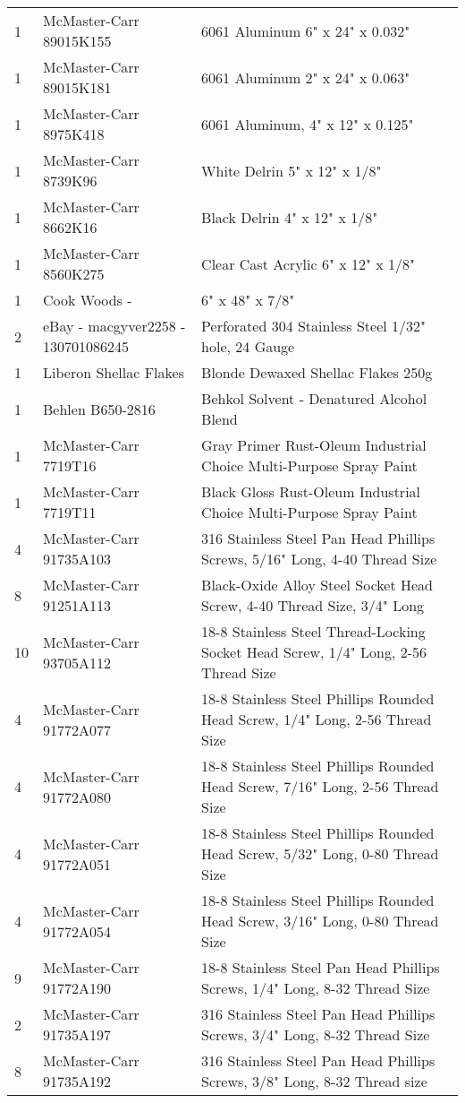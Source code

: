 \begin{longtabu}{X[1,c,m] X[6,c,m] X[9,l,m]}
  1 & McMaster-Carr 89015K155 & 6061 Aluminum 6" x 24" x 0.032" \\
  1 & McMaster-Carr 89015K181 & 6061 Aluminum 2" x 24" x 0.063" \\
  1 & McMaster-Carr 8975K418 & 6061 Aluminum, 4" x 12" x 0.125" \\
  1 & McMaster-Carr 8739K96 & White Delrin 5" x 12" x 1/8" \\
  1 & McMaster-Carr 8662K16 & Black Delrin 4" x 12" x 1/8" \\
  1 & McMaster-Carr 8560K275 & Clear Cast Acrylic 6" x 12" x 1/8" \\
  1 & Cook Woods - \wood{} & 6" x 48" x 7/8" \\
  2 & eBay - macgyver2258 - 130701086245 & Perforated 304 Stainless Steel 1/32" hole, 24 Gauge \\ \mrule

  1 & Liberon Shellac Flakes & Blonde Dewaxed Shellac Flakes 250g \\
  1 & Behlen B650-2816 & Behkol Solvent - Denatured Alcohol Blend \\
  1 & McMaster-Carr 7719T16 & Gray Primer Rust-Oleum Industrial Choice Multi-Purpose Spray Paint \\
  1 & McMaster-Carr 7719T11 & Black Gloss Rust-Oleum Industrial Choice Multi-Purpose Spray Paint \\ \mrule

  4 & McMaster-Carr 91735A103 & 316 Stainless Steel Pan Head Phillips Screws, 5/16" Long, 4-40 Thread Size \\
  8 & McMaster-Carr 91251A113 & Black-Oxide Alloy Steel Socket Head Screw, 4-40 Thread Size, 3/4" Long \\
  10 & McMaster-Carr 93705A112 & 18-8 Stainless Steel Thread-Locking Socket Head Screw, 1/4" Long, 2-56 Thread Size \\
  4 & McMaster-Carr 91772A077 & 18-8 Stainless Steel Phillips Rounded Head Screw, 1/4" Long, 2-56 Thread Size \\
  4 & McMaster-Carr 91772A080 & 18-8 Stainless Steel Phillips Rounded Head Screw, 7/16" Long, 2-56 Thread Size \\
  4 & McMaster-Carr 91772A051 & 18-8 Stainless Steel Phillips Rounded Head Screw, 5/32" Long, 0-80 Thread Size \\
  4 & McMaster-Carr 91772A054 & 18-8 Stainless Steel Phillips Rounded Head Screw, 3/16" Long, 0-80 Thread Size \\
  9 & McMaster-Carr 91772A190 & 18-8 Stainless Steel Pan Head Phillips Screws, 1/4" Long, 8-32 Thread Size \\
  2 & McMaster-Carr 91735A197 & 316 Stainless Steel Pan Head Phillips Screws, 3/4" Long, 8-32 Thread Size \\
  8 & McMaster-Carr 91735A192 & 316 Stainless Steel Pan Head Phillips Screws, 3/8" Long, 8-32 Thread size \\


\end{longtabu}

